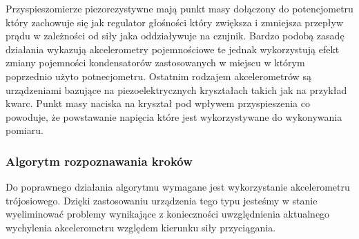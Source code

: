 Przyspieszomierze piezorezystywne mają punkt masy dołączony do
potencjometru który zachowuje się jak regulator głośności który zwiększa i
zmniejsza przepływ prądu w zależności od siły jaka oddziaływuje na czujnik.
Bardzo podobą zasadę działania wykazują akcelerometry pojemnościowe te jednak
wykorzystują efekt zmiany pojemności kondensatorów zastosowanych w miejscu w
którym poprzednio użyto potnecjometru. Ostatnim rodzajem akcelerometrów są
urządzeniami bazujące na piezoelektrycznych kryształach takich jak na przykład
kwarc. Punkt masy naciska na kryształ pod wpływem przyspieszenia co powoduje, że
powstawanie napięcia które jest wykorzystywane do wykonywania pomiaru. 


\subsubsection{Algorytm rozpoznawania kroków}
Do poprawnego działania algorytmu wymagane jest wykorzystanie akcelerometru
trójosiowego. Dzięki zastosowaniu urządzenia tego typu jesteśmy w stanie
wyeliminować problemy wynikające z konieczności uwzględnienia aktualnego
wychylenia akcelerometru względem kierunku siły przyciągania.

